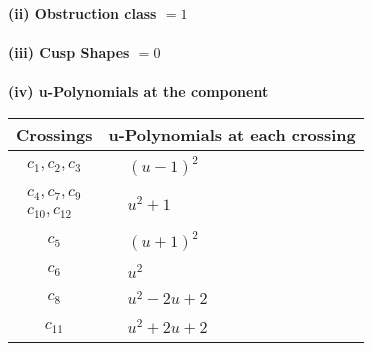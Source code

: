 \documentclass[1p]{elsarticle_modified}
\theoremstyle{definition}
\begin{document}
\flushleft \textbf{(ii) Obstruction class $= 1$}\\~\\
\flushleft \textbf{(iii) Cusp Shapes $= 0$}\\~\\
\newpage\renewcommand{\arraystretch}{1}
\flushleft \textbf{(iv) u-Polynomials at the component}\newline \\
\begin{tabular}{m{50pt}|m{274pt}}
Crossings & \hspace{64pt}u-Polynomials at each crossing \\
\hline $$\begin{aligned}c_{1},c_{2},c_{3}\end{aligned}$$&$\begin{aligned}
&(u-1)^2
\end{aligned}$\\
\hline $$\begin{aligned}c_{4},c_{7},c_{9}\\c_{10},c_{12}\end{aligned}$$&$\begin{aligned}
&u^2+1
\end{aligned}$\\
\hline $$\begin{aligned}c_{5}\end{aligned}$$&$\begin{aligned}
&(u+1)^2
\end{aligned}$\\
\hline $$\begin{aligned}c_{6}\end{aligned}$$&$\begin{aligned}
&u^2
\end{aligned}$\\
\hline $$\begin{aligned}c_{8}\end{aligned}$$&$\begin{aligned}
&u^2-2 u+2
\end{aligned}$\\
\hline $$\begin{aligned}c_{11}\end{aligned}$$&$\begin{aligned}
&u^2+2 u+2
\end{aligned}$\\
\hline
\end{tabular}\\~\\
\end{document}
